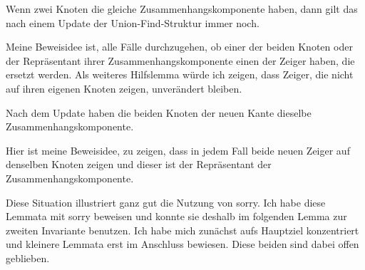 \begin{lemma}[\Kruskalupdateconofcon]\label{Kruskalupdateconofcon}
  Wenn zwei Knoten die gleiche Zusammenhangskomponente haben, dann gilt das nach einem Update der Union-Find-Struktur immer noch.
\end{lemma}
Meine Beweisidee ist, alle Fälle durchzugehen, ob einer der beiden Knoten oder der Repräsentant ihrer Zusammenhangskomponente einen der Zeiger haben, die ersetzt werden.
Als weiteres Hilfslemma würde ich zeigen, dass Zeiger, die nicht auf ihren eigenen Knoten zeigen, unverändert bleiben.

\begin{lemma}[\Kruskalnewedgecon]\label{Kruskalnewedgecon}
  Nach dem Update haben die beiden Knoten der neuen Kante dieselbe Zusammenhangskomponente.
\end{lemma}
Hier ist meine Beweisidee, zu zeigen, dass in jedem Fall beide neuen Zeiger auf denselben Knoten zeigen und dieser ist der Repräsentant der Zusammenhangskomponente.

Diese Situation illustriert ganz gut die Nutzung von sorry.
Ich habe diese Lemmata mit sorry beweisen und konnte sie deshalb im folgenden Lemma zur zweiten Invariante benutzen.
Ich habe mich zunächst aufs Hauptziel konzentriert und kleinere Lemmata erst im Anschluss bewiesen.
Diese beiden sind dabei offen geblieben.

